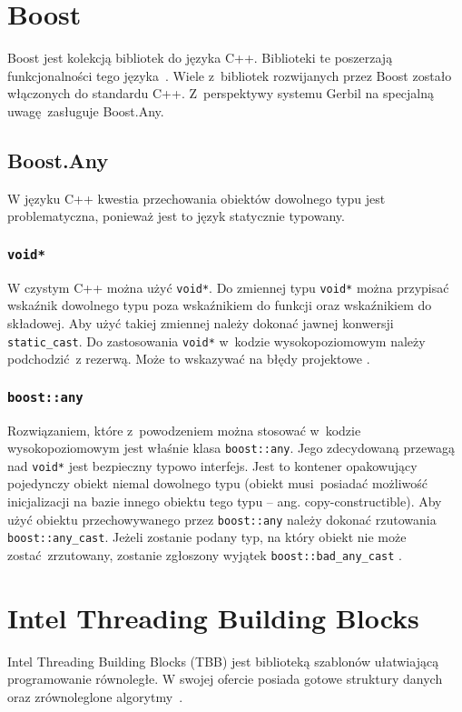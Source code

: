  \section{Boost}
Boost jest kolekcją bibliotek do języka C++. Biblioteki te poszerzają funkcjonalności tego języka~\cite{boost}. Wiele z~bibliotek rozwijanych przez Boost zostało włączonych do standardu C++. Z~perspektywy systemu Gerbil na specjalną uwagę zasługuje Boost.Any.



\subsection{Boost.Any}
W języku C++ kwestia przechowania obiektów dowolnego typu jest problematyczna, ponieważ jest to język statycznie typowany. 

\subsubsection{\lstinline$void*$}
W czystym C++ można użyć \lstinline$void*$. Do zmiennej typu \lstinline$void*$ można przypisać wskaźnik dowolnego typu poza wskaźnikiem do funkcji oraz wskaźnikiem do składowej. Aby użyć takiej zmiennej należy dokonać jawnej konwersji \lstinline$static_cast$. Do zastosowania \lstinline$void*$ w~kodzie wysokopoziomowym należy podchodzić z rezerwą. Może to wskazywać na błędy projektowe \cite{Stroustrup}.

\subsubsection{\lstinline$boost::any$}
Rozwiązaniem, które z~powodzeniem można stosować w~kodzie wysokopoziomowym jest właśnie klasa \lstinline$boost::any$. Jego zdecydowaną przewagą nad \lstinline$void*$ jest bezpieczny typowo interfejs. Jest to kontener opakowujący pojedynczy obiekt niemal dowolnego typu (obiekt musi posiadać możliwość inicjalizacji na bazie innego obiektu tego typu -- ang. copy-constructible).
Aby użyć obiektu przechowywanego przez \lstinline$boost::any$ należy dokonać rzutowania \lstinline$boost::any_cast$. Jeżeli zostanie podany typ, na który obiekt nie może zostać zrzutowany, zostanie zgłoszony wyjątek \lstinline$boost::bad_any_cast$ \cite{boost}.

 \section{Intel Threading Building Blocks}
Intel Threading Building Blocks (TBB) jest biblioteką szablonów ułatwiającą programowanie równoległe. W swojej ofercie posiada gotowe struktury danych oraz zrównoleglone algorytmy~\cite{tbb}.


